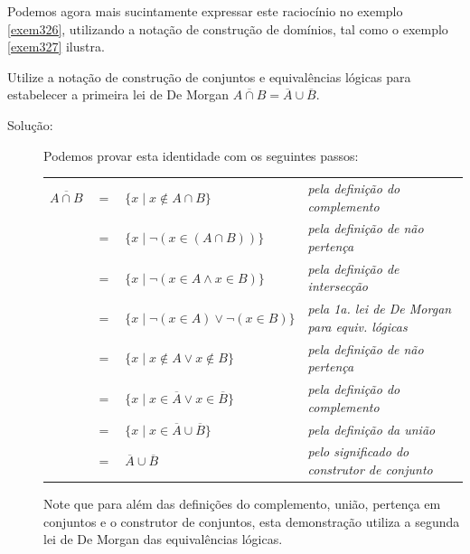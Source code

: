 Podemos agora mais sucintamente expressar este raciocínio no exemplo
\ref{exem326}, utilizando a notação de construção de domínios, tal como o
exemplo \ref{exem327} ilustra.

\begin{exmp}
\label{exem326}
Utilize a notação de construção de conjuntos e equivalências lógicas para
estabelecer a primeira lei de De Morgan $\overline{A \cap B} = \overline{A}
\cup \overline{B}$.
\begin{description}
\item[Solução:]Podemos provar esta identidade com os seguintes passos:

\begin{table}[H]
\centering 
\begin{tabular}{rcll}%
$\overline{A \cap B}$&$=$ & $\{x \mid x \notin A \cap B\}$ & \emph{pela
definição do complemento}\\
&$=$ & $\{x \mid \lnot (x \in (A \cap B))\}$ & \emph{pela definição de não
pertença}\\
&$=$ & $\{x \mid \lnot (x \in A \land x \in B)\}$ & \emph{pela definição de
intersecção}\\
&$=$ & $\{x \mid \lnot(x \in A) \lor \lnot (x \in B)\}$ & \emph{pela 1a. lei de
De Morgan para equiv. lógicas} \\
&$=$ & $\{x \mid x \notin A \lor x \notin B\}$ & \emph{pela definição de não
pertença}\\
&$=$ & $\{x \mid x \in \overline{A} \lor x \in \overline{B}\}$ & \emph{pela
definição do complemento}\\
&$=$ & $\{x \mid x \in \overline{A} \cup \overline{B}\}$ & \emph{pela definição
da união}\\
&$=$ & $\overline{A} \cup \overline{B}$ & \emph{pelo significado do construtor
de conjunto} 

\end{tabular}%
\end{table}
Note que para além das definições do complemento, união, pertença em conjuntos e
o construtor de conjuntos, esta demonstração utiliza a segunda lei de De Morgan
das equivalências lógicas.
\end{description}
\end{exmp}

